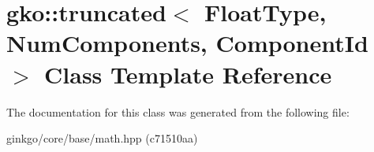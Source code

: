 \hypertarget{classgko_1_1truncated}{}\section{gko\+:\+:truncated$<$ Float\+Type, Num\+Components, Component\+Id $>$ Class Template Reference}
\label{classgko_1_1truncated}


The documentation for this class was generated from the following file\+:\begin{DoxyCompactItemize}
\item 
ginkgo/core/base/math.\+hpp (c71510aa)\end{DoxyCompactItemize}
